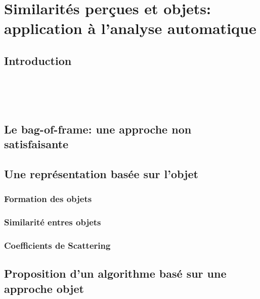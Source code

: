 \chapter[Similarités perçues et objets: application à l’analyse automatique]{Similarités perçues et objets: application à l’analyse automatique}\label{ch:ml_xp}


\section{Introduction}
\label{sec:ch8_intro}

 \\ 

 \\ 

 \\

\section{Le bag-of-frame: une approche non satisfaisante}


\section{Une représentation basée sur l'objet}

\subsection{Formation des objets}

\subsection{Similarité entres objets}

\subsection{Coefficients de Scattering}


\section{Proposition d'un algorithme basé sur une approche objet}
\label{sec:ch8_algoObjet}

